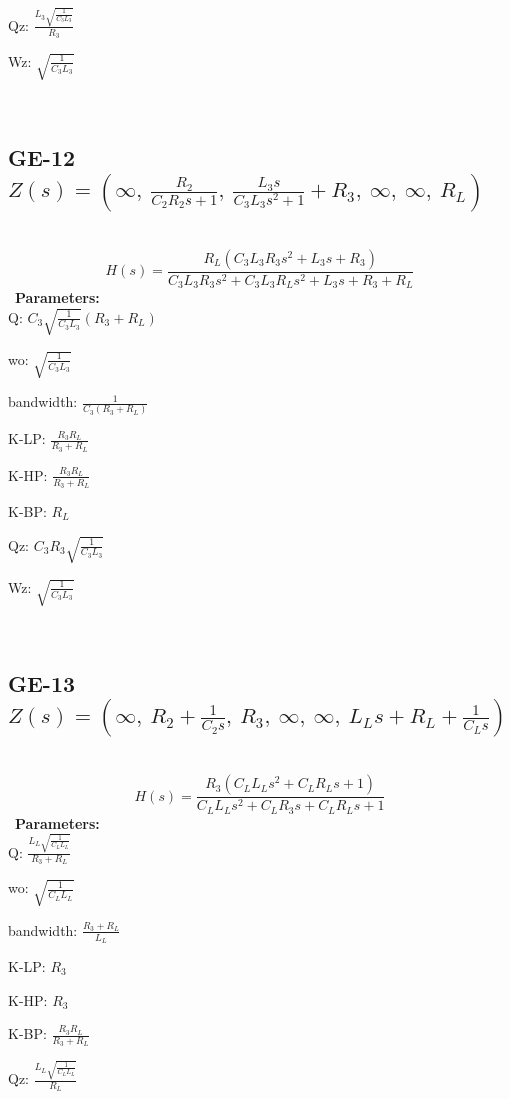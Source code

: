 \documentclass{article}
\begin{document}
Qz: $\frac{L_{3} \sqrt{\frac{1}{C_{3} L_{3}}}}{R_{3}}$\ 

Wz: $\sqrt{\frac{1}{C_{3} L_{3}}}$\ 

\ 

\subsection{GE-12 $Z(s) = \left( \infty, \  \frac{R_{2}}{C_{2} R_{2} s + 1}, \  \frac{L_{3} s}{C_{3} L_{3} s^{2} + 1} + R_{3}, \  \infty, \  \infty, \  R_{L}\right)$ } \ 
\textbf{\[H(s) = \frac{R_{L} \left(C_{3} L_{3} R_{3} s^{2} + L_{3} s + R_{3}\right)}{C_{3} L_{3} R_{3} s^{2} + C_{3} L_{3} R_{L} s^{2} + L_{3} s + R_{3} + R_{L}}\] } \ 
\textbf{Parameters:}\\ 

Q: $C_{3} \sqrt{\frac{1}{C_{3} L_{3}}} \left(R_{3} + R_{L}\right)$\ 

wo: $\sqrt{\frac{1}{C_{3} L_{3}}}$\ 

bandwidth: $\frac{1}{C_{3} \left(R_{3} + R_{L}\right)}$\ 

K-LP: $\frac{R_{3} R_{L}}{R_{3} + R_{L}}$\ 

K-HP: $\frac{R_{3} R_{L}}{R_{3} + R_{L}}$\ 

K-BP: $R_{L}$\ 

Qz: $C_{3} R_{3} \sqrt{\frac{1}{C_{3} L_{3}}}$\ 

Wz: $\sqrt{\frac{1}{C_{3} L_{3}}}$\ 

\ 

\subsection{GE-13 $Z(s) = \left( \infty, \  R_{2} + \frac{1}{C_{2} s}, \  R_{3}, \  \infty, \  \infty, \  L_{L} s + R_{L} + \frac{1}{C_{L} s}\right)$ } \ 
\textbf{\[H(s) = \frac{R_{3} \left(C_{L} L_{L} s^{2} + C_{L} R_{L} s + 1\right)}{C_{L} L_{L} s^{2} + C_{L} R_{3} s + C_{L} R_{L} s + 1}\] } \ 
\textbf{Parameters:}\\ 

Q: $\frac{L_{L} \sqrt{\frac{1}{C_{L} L_{L}}}}{R_{3} + R_{L}}$\ 

wo: $\sqrt{\frac{1}{C_{L} L_{L}}}$\ 

bandwidth: $\frac{R_{3} + R_{L}}{L_{L}}$\ 

K-LP: $R_{3}$\ 

K-HP: $R_{3}$\ 

K-BP: $\frac{R_{3} R_{L}}{R_{3} + R_{L}}$\ 

Qz: $\frac{L_{L} \sqrt{\frac{1}{C_{L} L_{L}}}}{R_{L}}$\ 
\end{document}
